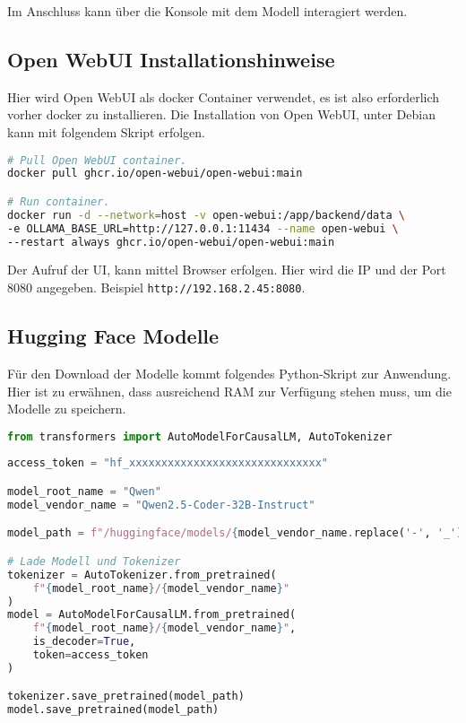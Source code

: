 Im Anschluss kann über die Konsole mit dem Modell interagiert werden.

\newpage

\subsection{Open WebUI Installationshinweise}\label{sec:open_webui}
Hier wird Open WebUI als docker Container verwendet, es ist also erforderlich vorher docker zu installieren. Die Installation von Open WebUI, unter Debian kann mit folgendem Skript erfolgen. 

\begin{lstlisting}[language=bash,caption={Open WebUI installieren}]
# Pull Open WebUI container.
docker pull ghcr.io/open-webui/open-webui:main

# Run container.
docker run -d --network=host -v open-webui:/app/backend/data \
-e OLLAMA_BASE_URL=http://127.0.0.1:11434 --name open-webui \
--restart always ghcr.io/open-webui/open-webui:main
\end{lstlisting}

Der Aufruf der UI, kann mittel Browser erfolgen. Hier wird die IP und der Port 8080 angegeben. Beispiel \texttt{http://192.168.2.45:8080}.

\newpage

\subsection{Hugging Face Modelle}

Für den Download der Modelle kommt folgendes Python-Skript zur Anwendung. Hier ist zu erwähnen, dass ausreichend RAM zur Verfügung stehen muss, um die Modelle zu speichern.

\begin{lstlisting}[language=python,caption={Laden der Modelle von Hugging Face und lokal speichern},label=lst:download_hugging_face_model]
from transformers import AutoModelForCausalLM, AutoTokenizer
	
access_token = "hf_xxxxxxxxxxxxxxxxxxxxxxxxxxxxxx"

model_root_name = "Qwen"
model_vendor_name = "Qwen2.5-Coder-32B-Instruct"

model_path = f"/huggingface/models/{model_vendor_name.replace('-', '_')}"

# Lade Modell und Tokenizer
tokenizer = AutoTokenizer.from_pretrained(
    f"{model_root_name}/{model_vendor_name}"
)
model = AutoModelForCausalLM.from_pretrained(
    f"{model_root_name}/{model_vendor_name}",
    is_decoder=True,
    token=access_token
)

tokenizer.save_pretrained(model_path)
model.save_pretrained(model_path)
\end{lstlisting}